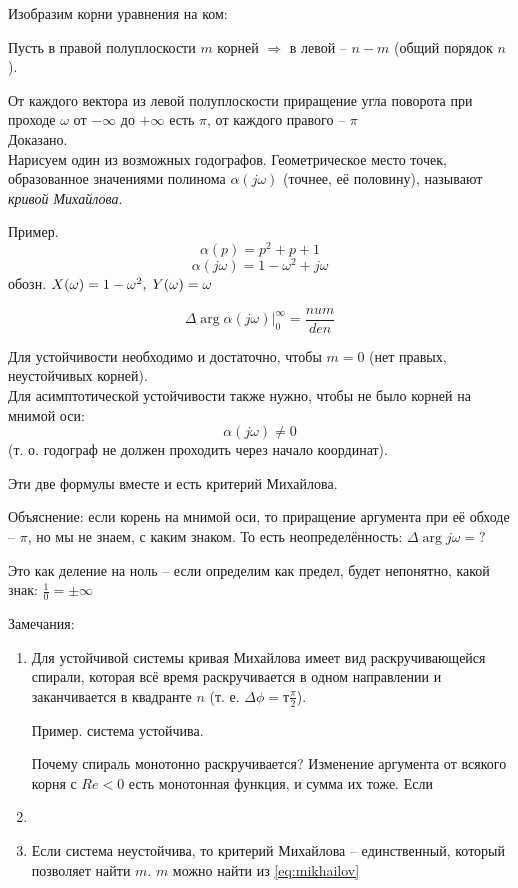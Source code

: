 \documentclass[main.tex]{subfiles}
\begin{document}
Изобразим корни уравнения на ком:

Пусть в правой полуплоскости $ m $ корней $ \Rightarrow $ в левой -- $ n - m $ (общий порядок $n$).

От каждого вектора из левой полуплоскости приращение угла поворота при проходе $ \omega $ от $ - \infty $ до $ + \infty $ есть $ \pi $, от каждого правого -- $ \pi $
$$ $$
Доказано. \\

Нарисуем один из возможных годографов.
Геометрическое место точек, образованное значениями полинома $ \alpha(j \omega) $ (точнее, её половину), называют \emph{кривой Михайлова}.

Пример.
$$ \alpha(p) = p^2 + p + 1 $$
$$ \alpha(j \omega) = 1 - \omega^2 + j \omega $$
обозн. $ X(\omega) = 1 - \omega^2, \thickspace Y(\omega) = \omega $ %
$$  $$

\begin{equation}\label{eq:mikhailov}
	\Delta \arg \alpha (j \omega) |_0^\infty = \frac{num}{den}
\end{equation}

Для устойчивости необходимо и достаточно, чтобы $ m = 0 $ (нет правых, неустойчивых корней).
\begin{equation}\label{eq:mikh1}
\boxed{}	%
\end{equation}
Для асимптотической устойчивости также нужно, чтобы не было корней на мнимой оси:
\begin{equation}\label{eq:mikh2}
	\boxed{ \alpha(j \omega) \ne 0 }
\end{equation}
(т. о. годограф не должен проходить через начало координат).

Эти две формулы вместе и есть критерий Михайлова.

Объяснение:
если корень на мнимой оси, то приращение аргумента при её обходе -- $\pi$, но мы не знаем, с каким знаком.
То есть неопределённость: $ \Delta \arg j \omega = ? $


Это как деление на ноль -- если определим как предел, будет непонятно, какой знак: $ \frac{1}{0} = \pm \infty $

Замечания:

\begin{enumerate}[noitemsep]
	\item Для устойчивой системы кривая Михайлова имеет вид раскручивающейся спирали, которая всё время раскручивается в одном направлении и заканчивается в квадранте $ n $ (т. е. $ \Delta \phi = т\frac{\pi}{2} $).
	
	Пример.
	система устойчива.
	
	Почему спираль монотонно раскручивается?
	Изменение аргумента от всякого корня с $ Re < 0 $ есть монотонная функция, и сумма их тоже.
	Если  
	\item %
	\item Если система неустойчива, то критерий Михайлова -- единственный, который позволяет найти $ m $.
	$m$ можно найти из \eqref{eq:mikhailov}
\end{enumerate}
\end{document}
